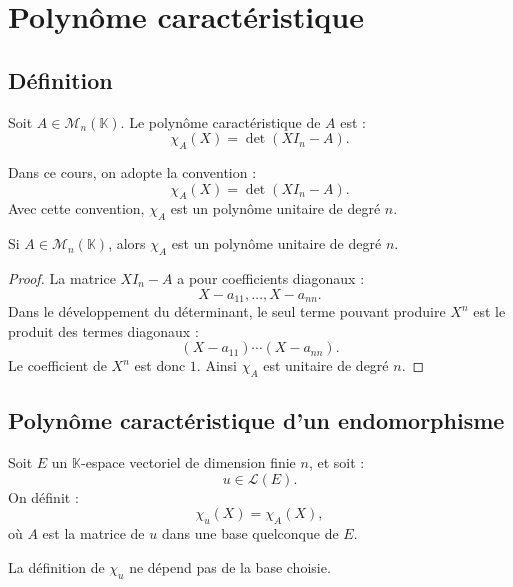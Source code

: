 \documentclass[11pt,a4paper]{article}
\newcommand{\K}{\mathbb K}
\newcommand{\M}{\mathcal M}
\newcommand{\Lcal}{\mathcal L}
\begin{document}
\section{Polynôme caractéristique}

\subsection{Définition}

\begin{definitionbox}
Soit \(A\in\M_n(\K)\).  
Le polynôme caractéristique de \(A\) est :
\[
\chi_A(X)=\det(XI_n-A).
\]
\end{definitionbox}

\begin{retenirbox}
Dans ce cours, on adopte la convention :
\[
\chi_A(X)=\det(XI_n-A).
\]
Avec cette convention, \(\chi_A\) est un polynôme unitaire de degré \(n\).
\end{retenirbox}

\begin{theorembox}
Si \(A\in\M_n(\K)\), alors \(\chi_A\) est un polynôme unitaire de degré \(n\).
\end{theorembox}

\begin{proof}
La matrice \(XI_n-A\) a pour coefficients diagonaux :
\[
X-a_{11},\dots,X-a_{nn}.
\]
Dans le développement du déterminant, le seul terme pouvant produire \(X^n\) est le produit des termes diagonaux :
\[
(X-a_{11})\cdots(X-a_{nn}).
\]
Le coefficient de \(X^n\) est donc \(1\).  
Ainsi \(\chi_A\) est unitaire de degré \(n\).
\end{proof}

\subsection{Polynôme caractéristique d'un endomorphisme}

\begin{definitionbox}
Soit \(E\) un \(\K\)-espace vectoriel de dimension finie \(n\), et soit :
\[
u\in\Lcal(E).
\]
On définit :
\[
\chi_u(X)=\chi_A(X),
\]
où \(A\) est la matrice de \(u\) dans une base quelconque de \(E\).
\end{definitionbox}

\begin{theorembox}
La définition de \(\chi_u\) ne dépend pas de la base choisie.
\end{theorembox}
\end{document}
